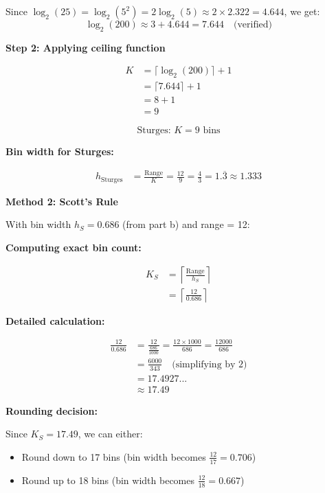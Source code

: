 \documentclass[12pt]{article}
\begin{document}
\begin{solution}
Since \(\log_2(25) = \log_2(5^2) = 2\log_2(5) \approx 2 \times 2.322 = 4.644\), we get:
\[
\log_2(200) \approx 3 + 4.644 = 7.644 \quad \text{(verified)}
\]

\textbf{Step 2: Applying ceiling function}

\begin{align*}
K &= \lceil \log_2(200) \rceil + 1 \\
&= \lceil 7.644 \rceil + 1 \\
&= 8 + 1 \\
&= 9
\end{align*}

\[
\boxed{\text{Sturges: } K = 9 \text{ bins}}
\]

\textbf{Bin width for Sturges:}

\begin{align*}
h_{\text{Sturges}} &= \frac{\text{Range}}{K} = \frac{12}{9} = \frac{4}{3} = 1.\overline{3} \approx 1.333
\end{align*}

\textbf{Method 2: Scott's Rule}

With bin width \(h_S = 0.686\) (from part b) and range = 12:

\textbf{Computing exact bin count:}

\begin{align*}
K_S &= \left\lceil \frac{\text{Range}}{h_S} \right\rceil \\
&= \left\lceil \frac{12}{0.686} \right\rceil
\end{align*}

\textbf{Detailed calculation:}

\begin{align*}
\frac{12}{0.686} &= \frac{12}{\frac{686}{1000}} = \frac{12 \times 1000}{686} = \frac{12000}{686} \\
&= \frac{6000}{343} \quad \text{(simplifying by 2)} \\
&= 17.4927... \\
&\approx 17.49
\end{align*}

\textbf{Rounding decision:}

Since \(K_S = 17.49\), we can either:
\begin{itemize}
    \item Round down to 17 bins (bin width becomes \(\frac{12}{17} = 0.706\))
    \item Round up to 18 bins (bin width becomes \(\frac{12}{18} = 0.667\))
\end{itemize}


\end{solution}
\end{document}
